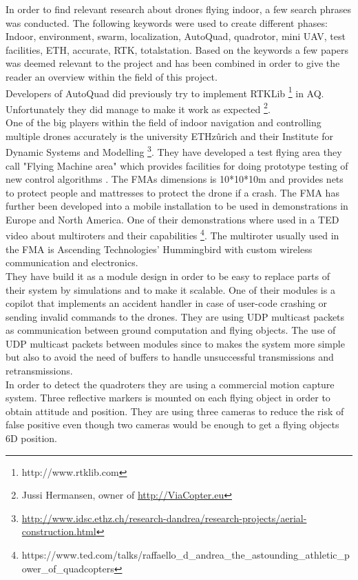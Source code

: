In order to find relevant research about drones flying indoor, a few search phrases was conducted.
The following keywords were used to create different phases: Indoor, environment, swarm, localization, AutoQuad, quadrotor, mini UAV, test facilities, ETH, accurate, RTK, totalstation.
Based on the keywords a few papers was deemed relevant to the project and has been combined in order to give the reader an overview within the field of this project. \\

Developers of AutoQuad did previously try to implement RTKLib \footnote{http://www.rtklib.com} in AQ. Unfortunately they did manage to make it work as expected \footnote{Jussi Hermansen, owner of \url{http://ViaCopter.eu}}.\\

One of the big players within the field of indoor navigation and controlling multiple drones accurately is the university ETHzûrich and their Institute for Dynamic Systems and Modelling \footnote{\url{http://www.idsc.ethz.ch/research-dandrea/research-projects/aerial-construction.html}}. They have developed a test flying area they call "Flying Machine area" which provides facilities for doing prototype testing of new control algorithms \cite{lupashin2014platform}. The FMAs dimensions is 10*10*10m and provides nets to protect people and mattresses to protect the drone  if a crash. The FMA has further been developed into a mobile installation to be used in demonstrations in Europe and North America. One of their demonstrations where used in a TED video about multiroters and their capabilities \footnote{https://www.ted.com/talks/raffaello\_d\_andrea\_the\_astounding\_athletic\_power\_of\_quadcopters}.
The multiroter usually used in the FMA is Ascending Technologies' Hummingbird with custom wireless communication and electronics. \\
They have build it as a module design in order to be easy to replace parts of their system by simulations and to make it scalable.
One of their modules is a copilot that implements an accident handler in case of user-code crashing or sending invalid commands to the drones.
They are using UDP multicast packets as communication between ground computation and flying objects. The use of UDP multicast packets between modules since to makes the system more simple but also to avoid the need of buffers to handle unsuccessful transmissions and retransmissions. \\
In order to detect the quadroters they are using a commercial motion capture system. Three reflective markers is mounted on each flying object in order to obtain attitude and position. They are using three cameras to reduce the risk of false positive even though two cameras would be enough to get a flying objects 6D position.\\
 
